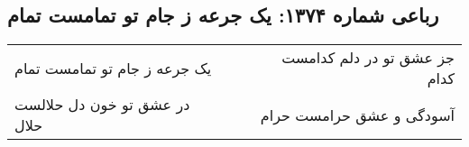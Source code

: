 \begin{center}
\section*{رباعی شماره ۱۳۷۴: یک جرعه ز جام تو تمامست تمام}
\label{sec:1374}
\begin{longtable}{l p{0.5cm} r}
یک جرعه ز جام تو تمامست تمام
&&
جز عشق تو در دلم کدامست کدام
\\
در عشق تو خون دل حلالست حلال
&&
آسودگی و عشق حرامست حرام
\\
\end{longtable}
\end{center}
